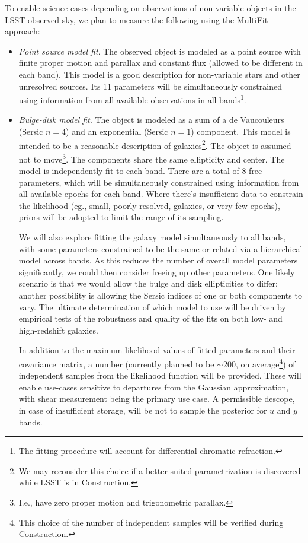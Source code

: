 \documentclass[SE,lsstdraft,toc]{lsstdoc}
\newcommand{\marginreq}[1]{\marginpar{\hspace{0pt}\tiny #1}}
\newcommand{\dmreq}[1]{\marginreq{DMS-REQ-#1}}
\begin{document}
To enable science cases depending on observations of non-variable objects in the LSST-observed sky, we plan to measure the following using the MultiFit approach:
%
\begin{itemize}
    \item \emph{Point source model fit}. The observed object is modeled as a point source with finite proper motion and parallax and constant flux (allowed to be different in each band). \dmreq{0276} This model is a good description for non-variable stars and other unresolved sources. Its 11 parameters will be simultaneously constrained using information from all available observations in all bands\footnote{The fitting procedure will account for differential chromatic refraction.}.
    \item \emph{Bulge-disk model fit}. \dmreq{0276} The object is modeled as a sum of a de Vaucouleurs (Sersic $n=4$) and an exponential (Sersic $n=1$) component. This model is intended to be a reasonable description of galaxies\footnote{We may reconsider this choice if a better suited parametrization is discovered while LSST is in Construction.}. The object is assumed not to move\footnote{I.e., have zero proper motion and trigonometric parallax.}. The components share the same ellipticity and center. The model is independently fit to each band. There are a total of 8 free parameters, which will be simultaneously constrained using information from all available epochs for each band. Where there's insufficient data to constrain the likelihood (eg., small, poorly resolved, galaxies, or very few epochs), priors will be adopted to limit the range of its sampling.

We will also explore fitting the galaxy model simultaneously to all bands, with some parameters constrained to be the same or related via a hierarchical model across bands.  As this reduces the number of overall model parameters significantly, we could then consider freeing up other parameters. One likely scenario is that we would allow the bulge and disk ellipticities to differ; another possibility is allowing the Sersic indices of one or both components to vary.  The ultimate determination of which model to use will be driven by empirical tests of the robustness and quality of the fits on both low- and high-redshift galaxies.

\dmreq{0333}
In addition to the maximum likelihood values of fitted parameters and their covariance matrix, a number (currently planned to be $\sim 200$, on average\footnote{This choice of the number of independent samples will be verified during Construction.}) of independent samples from the likelihood function will be provided. These will enable use-cases sensitive to departures from the Gaussian approximation, with shear measurement being the primary use case. A permissible descope, in case of insufficient storage, will be not to sample the posterior for $u$ and $y$ bands.


\end{itemize}
\end{document}
